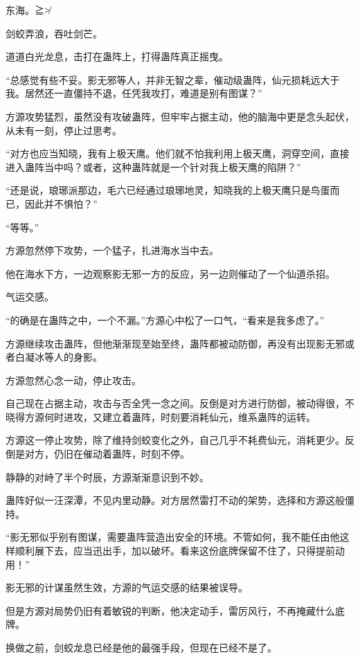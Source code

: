 
\begin{this_body}

东海。≧≯

剑蛟弄浪，吞吐剑芒。

道道白光龙息，击打在蛊阵上，打得蛊阵真正摇曳。

“总感觉有些不妥。影无邪等人，并非无智之辈，催动级蛊阵，仙元损耗远大于我。居然还一直僵持不退，任凭我攻打，难道是别有图谋？”

方源攻势猛烈，虽然没有攻破蛊阵，但牢牢占据主动，他的脑海中更是念头起伏，从未有一刻，停止过思考。

“对方也应当知晓，我有上极天鹰。他们就不怕我利用上极天鹰，洞穿空间，直接进入蛊阵当中吗？或者，这种蛊阵就是一个针对我上极天鹰的陷阱？”

“还是说，琅琊派那边，毛六已经通过琅琊地灵，知晓我的上极天鹰只是鸟蛋而已，因此并不惧怕？”

“等等。”

方源忽然停下攻势，一个猛子，扎进海水当中去。

他在海水下方，一边观察影无邪一方的反应，另一边则催动了一个仙道杀招。

气运交感。

“的确是在蛊阵之中，一个不漏。”方源心中松了一口气，“看来是我多虑了。”

方源继续攻击蛊阵，但他渐渐现至始至终，蛊阵都被动防御，再没有出现影无邪或者白凝冰等人的身影。

方源忽然心念一动，停止攻击。

自己现在占据主动，攻击与否全凭一念之间。反倒是对方进行防御，被动得很，不晓得方源何时进攻，又建立着蛊阵，时刻要消耗仙元，维系蛊阵的运转。

方源这一停止攻势，除了维持剑蛟变化之外，自己几乎不耗费仙元，消耗更少。反倒是对方，仍旧在催动着蛊阵，时刻不停。

静静的对峙了半个时辰，方源渐渐意识到不妙。

蛊阵好似一汪深潭，不见内里动静。对方居然雷打不动的架势，选择和方源这般僵持。

“影无邪似乎别有图谋，需要蛊阵营造出安全的环境。不管如何，我不能任由他这样顺利展下去，应当迅出手，加以破坏。看来这份底牌保留不住了，只得提前动用！”

影无邪的计谋虽然生效，方源的气运交感的结果被误导。

但是方源对局势仍旧有着敏锐的判断，他决定动手，雷厉风行，不再掩藏什么底牌。

换做之前，剑蛟龙息已经是他的最强手段，但现在已经不是了。


\end{this_body}
